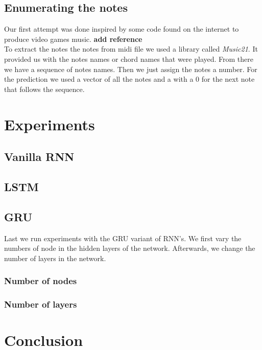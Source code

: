 \documentclass[11pt]
{article}
\begin{document}
\subsection{Enumerating the notes}
Our first attempt was done inspired by some code found on the internet to produce video games music. \textbf{add reference}\\
To extract the notes the notes from midi file we used a library called \textit{Music21}. It provided us with the notes names or chord names that were played. From there we have a sequence of notes names. Then we just assign the notes a number.
For the prediction we used a vector of all the notes and a with a 0 for the next note that follows the sequence.

\section{Experiments}
\subsection{Vanilla RNN}
\subsection{LSTM}
\subsection{GRU}
Last we run experiments with the GRU variant of RNN's. We first vary the numbers of node in the hidden layers of the network. Afterwards, we change the number of layers in the network. 

\subsubsection{Number of nodes}
\subsubsection{Number of layers}




\section{Conclusion}




\end{document}
